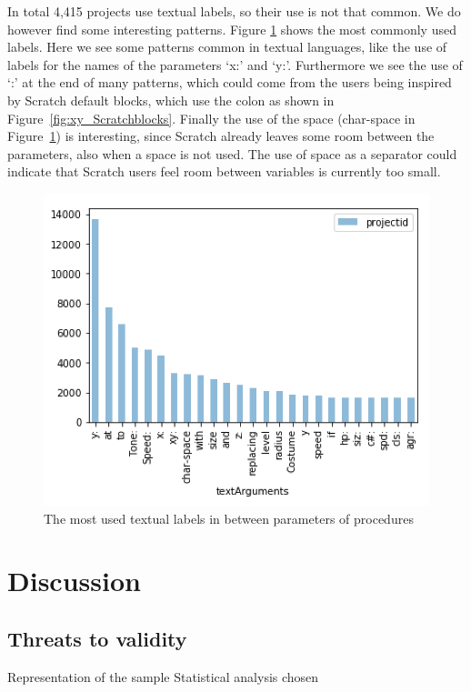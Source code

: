 \documentclass[conference]{IEEEtran}
\begin{document}
In total 4,415 projects use textual labels, so their use is not that common. We do however find some interesting patterns. Figure \ref{fig:labels} shows the most commonly used labels. Here we see some patterns common in textual languages, like the use of labels for the names of the parameters `x:' and `y:'. Furthermore we see the use of `:' at the end of many patterns, which could come from the users being inspired by Scratch default blocks, which use the colon as shown in Figure~\ref{fig:xy_Scratchblocks}. Finally the use of the space (char-space in Figure~\ref{fig:labels}) is interesting, since Scratch already leaves some room between the parameters, also when a space is not used. The use of space as a separator could indicate that Scratch users feel room between variables is currently too small.

\begin{figure}
	\begin{center}
		\includegraphics[width=\columnwidth]{fig/text_in_the_middle_func_occurrences}
		\caption{The most used textual labels in between parameters of procedures}
		\label{fig:labels}
	\end{center}
\end{figure} 



 \section{Discussion}
\subsection{Threats to validity}
Representation of the sample
Statistical analysis chosen
\end{document}
